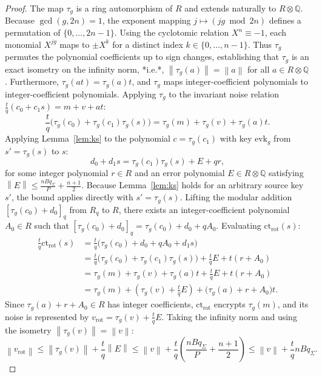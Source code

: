 \documentclass[11pt]{article}
\theoremstyle{definition}
\theoremstyle{remark}
\newcommand{\norm}[1]{\left\lVert #1\right\rVert}
\newcommand{\ctrot}{\mathrm{ct}_{\mathrm{rot}}}
\newcommand{\vrot}{v_{\mathrm{rot}}}
\begin{document}
\begin{proof}
The map $\tau_g$ is a ring automorphism of $R$ and extends naturally to $R \otimes \mathbb{Q}$.
Because $\gcd(g, 2n) = 1$, the exponent mapping $j \mapsto (j g \bmod 2n)$ defines a permutation of $\{0, \dots, 2n-1\}$.
Using the cyclotomic relation $X^n \equiv -1$, each monomial $X^{jg}$ maps to $\pm X^k$ for a distinct index $k \in \{0, \dots, n-1\}$.
Thus $\tau_g$ permutes the polynomial coefficients up to sign changes, establishing that $\tau_g$ is an exact isometry on the infinity norm, *i.e.*, $\norm{\tau_g(a)} = \norm{a}$ for all $a \in R \otimes \mathbb{Q}$.
Furthermore, $\tau_g(at) = \tau_g(a)t$, and $\tau_g$ maps integer-coefficient polynomials to integer-coefficient polynomials.
Applying $\tau_g$ to the invariant noise relation $\frac{t}{q}(c_0 + c_1 s) = m + v + at$:
\[
  \frac{t}{q}\bigl(\tau_g(c_0) + \tau_g(c_1)\tau_g(s)\bigr) = \tau_g(m) + \tau_g(v) + \tau_g(a)t.
\]
Applying Lemma~\ref{lem:ks} to the polynomial $c = \tau_g(c_1)$ with key $\mathrm{evk}_g$ from $s' = \tau_g(s)$ to $s$:
\[
  d_0 + d_1 s = \tau_g(c_1)\tau_g(s) + E + q r,
\]
for some integer polynomial $r \in R$ and an error polynomial $E \in R \otimes \mathbb{Q}$ satisfying $\norm{E} \leq \frac{n B q_\Sigma}{P} + \frac{n+1}{2}$.
Because Lemma~\ref{lem:ks} holds for an arbitrary source key $s'$, the bound applies directly with $s' = \tau_g(s)$.
Lifting the modular addition $[\tau_g(c_0) + d_0]_q$ from $R_q$ to $R$, there exists an integer-coefficient polynomial $A_0 \in R$ such that $[\tau_g(c_0) + d_0]_q = \tau_g(c_0) + d_0 + q A_0$.
Evaluating $\ctrot(s)$:
\begin{align*}
  \frac{t}{q}\ctrot(s)
  &= \frac{t}{q}\bigl(\tau_g(c_0) + d_0 + q A_0 + d_1 s\bigr)\\
  &= \frac{t}{q}\bigl(\tau_g(c_0) + \tau_g(c_1)\tau_g(s)\bigr) + \frac{t}{q}E + t (r + A_0)\\
  &= \tau_g(m) + \tau_g(v) + \tau_g(a)t + \frac{t}{q}E + t (r + A_0)\\
  &= \tau_g(m) + \left(\tau_g(v) + \frac{t}{q}E\right) + \bigl(\tau_g(a) + r + A_0\bigr)t.
\end{align*}
Since $\tau_g(a) + r + A_0 \in R$ has integer coefficients, $\ctrot$ encrypts $\tau_g(m)$, and its noise is represented by $\vrot = \tau_g(v) + \frac{t}{q}E$.
Taking the infinity norm and using the isometry $\norm{\tau_g(v)} = \norm{v}$:
\[
  \norm{\vrot} \leq \norm{\tau_g(v)} + \frac{t}{q}\norm{E} \leq \norm{v} + \frac{t}{q}\left(\frac{n B q_\Sigma}{P} + \frac{n+1}{2}\right) \leq \norm{v} + \frac{t}{q} n B q_\Sigma.
\]
\end{proof}
\end{document}
